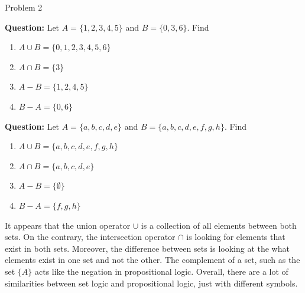 \begin{problem}{Problem 2}
    \begin{Highlight}[Solution - \#3]
        \noindent \textbf{Question:} Let $A = \{ 1, 2, 3, 4, 5\}$ and $B = \{ 0, 3, 6\}$. Find

        \begin{enumerate}[label=(\alph*)]
            \item $A \cup B = \{0,1,2,3,4,5,6\}$
            \item $A \cap B = \{3\}$
            \item $A - B = \{1,2,4,5\}$
            \item $B - A = \{0,6\}$
        \end{enumerate}
    \end{Highlight}

    \begin{Highlight}[Solution - \#4]
        \noindent \textbf{Question:} Let $A = \{ a, b, c, d, e\}$ and $B = \{ a, b, c, d, e, f, g, h\}$. Find

        \begin{enumerate}[label=(\alph*)]
            \item $A \cup B = \{a,b,c,d,e,f,g,h\}$
            \item $A \cap B = \{a,b,c,d,e\}$
            \item $A - B = \{\emptyset\}$
            \item $B - A = \{f,g,h\}$
        \end{enumerate}
    \end{Highlight}

    \begin{Highlight}[Insights]
        It appears that the union operator $\cup$ is a collection of all elements between both sets. On the contrary, the intersection operator $\cap$ is looking for elements that exist in both sets.
        Moreover, the difference between sets is looking at the what elements exist in one set and not the other. The complement of a set, such as the set $\{A\}$ acts like the negation in propositional
        logic. Overall, there are a lot of similarities between set logic and propositional logic, just with different symbols.
    \end{Highlight}
\end{problem}

